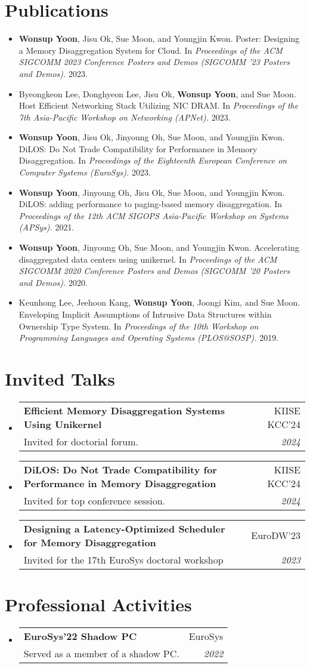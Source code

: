 \documentclass[letterpaper,11pt]{article}
\makeatletter
\newcommand{\resumePub}[1]{
  \item\small{#1 \vspace{-2pt}}
}
\newcommand{\resumeSubheading}[4]{
  \vspace{-1pt}\item
    \begin{tabular*}{0.97\textwidth}[t]{l@{\extracolsep{\fill}}r}
      \textbf{#1} & #2 \\
      {\small#3} & \textit{\small #4} \\
    \end{tabular*}\vspace{-5pt}
}
\newcommand{\resumeSubHeadingListStart}{\begin{itemize}[leftmargin=*]}
\newcommand{\resumeSubHeadingListEnd}{\end{itemize}}
\makeatother
\begin{document}
\section{Publications}
\resumeSubHeadingListStart
\resumePub{\textbf{Wonsup Yoon}, Jisu Ok, Sue Moon, and Youngjin Kwon. Poster: Designing a Memory Disaggregation System for Cloud. In \textit{Proceedings of the ACM SIGCOMM 2023 Conference Posters and Demos (SIGCOMM '23 Posters and Demos).} 2023.}
\resumePub{Byeongkeon Lee, Donghyeon Lee, Jisu Ok, \textbf{Wonsup Yoon}, and Sue Moon. Host Efficient Networking Stack Utilizing NIC DRAM. In \textit{Proceedings of the 7th Asia-Pacific Workshop on Networking (APNet).} 2023.}
\resumePub{\textbf{Wonsup Yoon}, Jisu Ok, Jinyoung Oh, Sue Moon, and Youngjin Kwon. DiLOS: Do Not Trade Compatibility for Performance in Memory Disaggregation. In \textit{Proceedings of the Eighteenth European Conference on Computer Systems (EuroSys).} 2023.}
\resumePub{\textbf{Wonsup Yoon}, Jinyoung Oh, Jisu Ok, Sue Moon, and Youngjin Kwon. DiLOS: adding performance to paging-based memory disaggregation. In \textit{Proceedings of the 12th ACM SIGOPS Asia-Pacific Workshop on Systems (APSys).} 2021.}
\resumePub{\textbf{Wonsup Yoon}, Jinyoung Oh, Sue Moon, and Youngjin Kwon. Accelerating disaggregated data centers using unikernel. In \textit{Proceedings of the ACM SIGCOMM 2020 Conference Posters and Demos (SIGCOMM '20 Posters and Demos).} 2020.}
\resumePub{Keunhong Lee, Jeehoon Kang, \textbf{Wonsup Yoon}, Joongi Kim, and Sue Moon. Enveloping Implicit Assumptions of Intrusive Data Structures within Ownership Type System. In \textit{Proceedings of the 10th Workshop on Programming Languages and Operating Systems (PLOS@SOSP).} 2019.}
\resumeSubHeadingListEnd



\section{Invited Talks}
\resumeSubHeadingListStart
\resumeSubheading{Efficient Memory Disaggregation Systems Using Unikernel}{KIISE KCC'24}{Invited for doctorial forum.}{2024}
\resumeSubheading{DiLOS: Do Not Trade Compatibility for Performance in Memory Disaggregation}{KIISE KCC'24}{Invited for top conference session.}{2024}
\resumeSubheading{Designing a Latency-Optimized Scheduler for Memory Disaggregation}{EuroDW'23}{Invited for the 17th EuroSys doctoral workshop}{2023}
\resumeSubHeadingListEnd

\section{Professional Activities}
\resumeSubHeadingListStart
\resumeSubheading{EuroSys'22 Shadow PC}{EuroSys}{Served as a member of a shadow PC.}{2022}
\resumeSubHeadingListEnd


\end{document}
